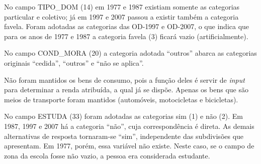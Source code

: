 \begin{table}[htb]
\centering

\end{table}

No campo TIPO_DOM (14) em 1977 e 1987 existiam somente as categorias particular e coletivo; já em 1997 e 2007 passou a existir também a categoria favela. Foram adotadas as categorias das OD-1997 e OD-2007, o que indica que para os anos de 1977 e 1987 a categoria favela (3) ficará vazio (artificialmente).

No campo COND_MORA (20) a categoria adotada ``outros'' abarca as categorias originais ``cedida'', ``outros'' e ``não se aplica''.

Não foram mantidos os bens de consumo, pois a função deles é servir de \emph{input} para determinar a renda atribuída, a qual já se dispõe. Apenas os bens que são meios de transporte foram mantidos (automóveis, motocicletas e bicicletas).

No campo ESTUDA (33) foram adotadas as categorias sim (1) e não (2). Em 1987, 1997 e 2007 há a categoria ``não'', cuja correspondência é direta. As demais alternativas de resposta tornaram-se ``sim'', independente das subdivisões que apresentam. Em 1977, porém, essa variável não existe. Neste caso, se o campo de zona da escola fosse não vazio, a pessoa era considerada estudante.

